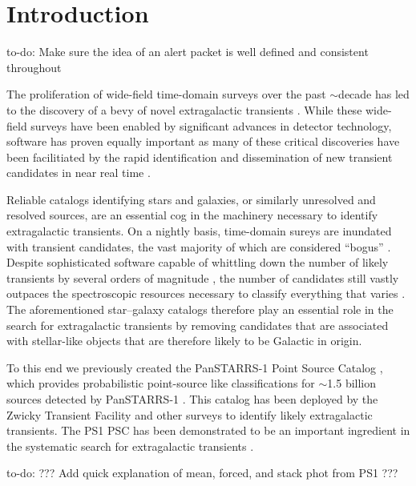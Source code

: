 \documentclass[twocolumn]{aastex63}
\newcommand{\todo}[1]{{\color{magenta} to-do: {#1}}}
\begin{document}
\section{Introduction} \label{sec:intro}

\todo{Make sure the idea of an alert packet is well defined and consistent throughout}

The proliferation of wide-field time-domain surveys over the past $\sim$decade
has led to the discovery of a bevy of novel extragalactic transients
\citep[e.g.,][]{quimby11,Gezari12,Gal-Yam14,Abbott17a,Prentice18,
IceCube-Collaboration18}. While these wide-field surveys have been enabled by
significant advances in detector technology, software has proven equally
important \citep[e.g.,][]{Masci17,Masci19,Smith20,Jones20} as many of these
critical discoveries have been facilitiated by the rapid identification and
dissemination of new transient candidates in near real time
\citep[e.g.,][]{Patterson19}.

Reliable catalogs identifying stars and galaxies, or similarly unresolved and
resolved sources, are an essential cog in the machinery necessary to identify
extragalactic transients. On a nightly basis, time-domain sureys are inundated
with transient candidates, the vast majority of which are considered ``bogus''
\citep{Bloom12}. Despite sophisticated software capable of whittling down the
number of likely transients by several orders of magnitude
\citep[e.g.,][]{Brink13,Goldstein15,Duev19,Smith20}, the number of candidates
still vastly outpaces the spectroscopic resources necessary to classify
everything that varies \citep[e.g.,][]{Kulkarni20}. The aforementioned
star--galaxy catalogs therefore play an essential role in the search for
extragalactic transients by removing candidates that are associated with
stellar-like objects that are therefore likely to be Galactic in origin.

To this end we previously created the PanSTARRS-1 Point Source Catalog
\citep[PS1 PSC; Tachibana \& Miller 2018, hereafter ][]{Tachibana18}, which
provides probabilistic point-source like classifications for $\sim$1.5 billion
sources detected by PanSTARRS-1 \citep[PS1;][]{Chambers16}. This catalog has
been deployed by the Zwicky Transient Facility \citep[ZTF;][]{Bellm19} and
other surveys \citep{Smith20,Moller20} to identify likely extragalactic
transients. The PS1 PSC has been demonstrated to be an important ingredient in
the systematic search for extragalactic transients \citep{Fremling20,De20}.

\todo{??? Add quick explanation of mean, forced, and stack phot from PS1 ???}
\end{document}
